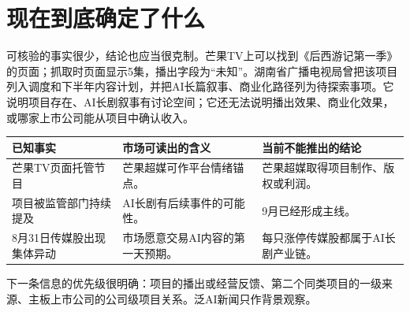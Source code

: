 \section{现在到底确定了什么}

可核验的事实很少，结论也应当很克制。芒果TV上可以找到《后西游记第一季》的页面；抓取时页面显示5集，播出字段为“未知”。湖南省广播电视局曾把该项目列入调度和下半年内容计划，并把AI长篇叙事、商业化路径列为待探索事项。它说明项目存在、AI长剧叙事有讨论空间；它还无法说明播出效果、商业化效果，或哪家上市公司能从项目中确认收入。

\begin{exhibitbox}[展品：事实与交易含义]
\begin{tabularx}{\textwidth}{L{3.0cm}X X}
\toprule
已知事实 & 市场可读出的含义 & 当前不能推出的结论 \\
\midrule
芒果TV页面托管节目 & 芒果超媒可作平台情绪锚点。 & 芒果超媒取得项目制作、版权或利润。 \\
项目被监管部门持续提及 & AI长剧有后续事件的可能性。 & 9月已经形成主线。 \\
8月31日传媒股出现集体异动 & 市场愿意交易AI内容的第一天预期。 & 每只涨停传媒股都属于AI长剧产业链。 \\
\bottomrule
\end{tabularx}
\end{exhibitbox}

下一条信息的优先级很明确：项目的播出或经营反馈、第二个同类项目的一级来源、主板上市公司的公司级项目关系。泛AI新闻只作背景观察。
